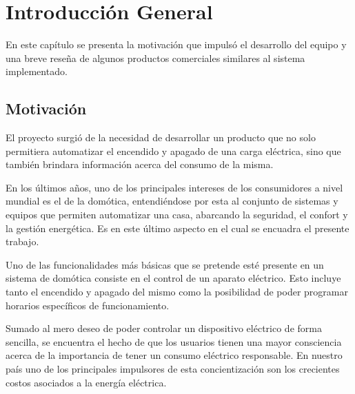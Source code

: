 
\chapter{Introducción General} %

\label{Chapter1} %
\label{IntroGeneral}


\newcommand{\keyword}[1]{\textbf{#1}}
\newcommand{\tabhead}[1]{\textbf{#1}}
\newcommand{\code}[1]{\texttt{#1}}
\newcommand{\file}[1]{\texttt{\bfseries#1}}
\newcommand{\option}[1]{\texttt{\itshape#1}}
\newcommand{\grados}{$^{\circ}$}

En este capítulo se presenta la motivación que impulsó el desarrollo del equipo y una breve reseña de algunos productos comerciales similares al sistema implementado.

\section{Motivación}

El proyecto surgió de la necesidad de desarrollar un producto que no solo permitiera automatizar el encendido y apagado de una carga eléctrica, sino que también brindara información acerca del consumo de la misma.

En los últimos años, uno de los principales intereses de los consumidores a nivel mundial es el de la domótica, entendiéndose por esta al conjunto de sistemas y equipos que permiten automatizar una casa, abarcando la seguridad, el confort y la gestión energética. Es en este último aspecto en el cual se encuadra el presente trabajo.

Uno de las funcionalidades más básicas que se pretende esté presente en un sistema de domótica consiste en el control de un aparato eléctrico. Esto incluye tanto el encendido y apagado del mismo como la posibilidad de poder programar horarios específicos de funcionamiento.

Sumado al mero deseo de poder controlar un dispositivo eléctrico de forma sencilla, se encuentra el hecho de que los usuarios tienen una mayor consciencia acerca de la importancia de tener un consumo eléctrico responsable. En nuestro país uno de los principales impulsores de esta concientización son los crecientes costos asociados a la energía eléctrica.

